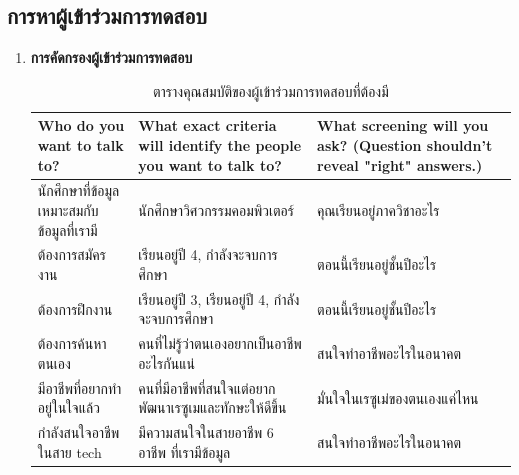 \subsection{การหาผู้เข้าร่วมการทดสอบ}
\begin{enumerate}
    \item \textbf{การคัดกรองผู้เข้าร่วมการทดสอบ}
            \begin{table}[H]
                \caption{ตารางคุณสมบัติของผู้เข้าร่วมการทดสอบที่ต้องมี}
                \label{tab:my-table}
                \begin{tabularx}{\textwidth}{|X|X|X|}
                \hline
                \textbf{Who do you want to talk to?}       & \textbf{What exact criteria will identify the people you want to talk to?} & \textbf{What screening will you ask? (Question shouldn't reveal "right" answers.)} \\ \hline
                นักศึกษาที่ข้อมูลเหมาะสมกับข้อมูลที่เรามี  & นักศึกษาวิศวกรรมคอมพิวเตอร์                                                & คุณเรียนอยู่ภาควิชาอะไร                                                            \\ \hline
                ต้องการสมัครงาน                            & เรียนอยู่ปี 4, กำลังจะจบการศึกษา                                           & ตอนนี้เรียนอยู่ชั้นปีอะไร                                                          \\ \hline
                ต้องการฝึกงาน                              & เรียนอยู่ปี 3, เรียนอยู่ปี 4, กำลังจะจบการศึกษา                            & ตอนนี้เรียนอยู่ชั้นปีอะไร                                                          \\ \hline
                ต้องการค้นหาตนเอง                          & คนที่ไม่รู้ว่าตนเองอยากเป็นอาชีพอะไรกันแน่                                 & สนใจทำอาชีพอะไรในอนาคต                                                             \\ \hline
                มีอาชีพที่อยากทำอยู่ในใจแล้ว               & คนที่มีอาชีพที่สนใจแต่อยากพัฒนาเรซูเมและทักษะให้ดีขึ้น                     & มั่นใจในเรซูเม่ของตนเองแค่ไหน                                                      \\ \hline
                กำลังสนใจอาชีพในสาย tech                   & มีความสนใจในสายอาชีพ 6 อาชีพ ที่เรามีข้อมูล                                & สนใจทำอาชีพอะไรในอนาคต                                                             \\ \hline

\end{tabularx}
\end{table}
\end{enumerate}
